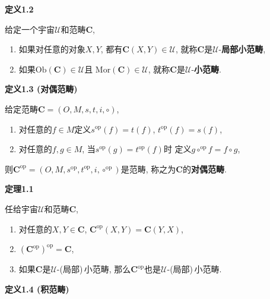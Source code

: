 \documentclass[UTF8]{ctexart}
\begin{document}
\hypertarget{sec:定义1.2}{}
\noindent\textbf{定义1.2}

给定一个宇宙$\mathcal{U}$和范畴$\mathbf{C}$,
\begin{enumerate}
    \item 如果对任意的对象$X,Y$, 都有$\mathbf{C}(X,Y)\in\mathcal{U}$,
    就称$\mathbf{C}$是$\mathcal{U}$-\textbf{局部小范畴},
    \item 如果$\mathrm{Ob}(\mathbf{C})\in\mathcal{U}$且
    $\mathrm{Mor}(\mathbf{C})\in\mathcal{U}$,
    就称$\mathbf{C}$是$\mathcal{U}$-\textbf{小范畴}.
\end{enumerate}

\vspace{10pt}

\hypertarget{sec:定义1.3}{}
\noindent\textbf{定义1.3 (对偶范畴)}

给定范畴$\mathbf{C}=(O,M,s,t,i,\circ)$,
\begin{enumerate}
    \item 对任意的$f\in M$定义$s^{\mathrm{op}}(f)=t(f)$, $t^{\mathrm{op}}(f)=s(f)$,
    \item 对任意的$f,g\in M$, 当$s^{\mathrm{op}}(g)=t^{\mathrm{op}}(f)$时
    定义$g\circ^{\mathrm{op}}f=f\circ g$,
\end{enumerate}
则$\mathbf{C}^{\mathrm{op}}=
(O,M,s^{\mathrm{op}},t^{\mathrm{op}},i,\circ^{\mathrm{op}})$是范畴,
称之为$\mathbf{C}$的\textbf{对偶范畴}.

\vspace{10pt}

\hypertarget{sec:定理1.1}{}
\noindent\textbf{定理1.1}

任给宇宙$\mathcal{U}$和范畴$\mathbf{C}$,
\begin{enumerate}
    \item 对任意的$X,Y\in\mathbf{C}$,
    $\mathbf{C}^{\mathrm{op}}(X,Y)=\mathbf{C}(Y,X)$,
    \item $(\mathbf{C}^{\mathrm{op}})^{\mathrm{op}}=\mathbf{C}$,
    \item 如果$\mathbf{C}$是$\mathcal{U}$-(局部)\,\!小范畴,
    那么$\mathbf{C}^{\mathrm{op}}$也是$\mathcal{U}$-(局部)\,\!小范畴.
\end{enumerate}





\newpage

\hypertarget{sec:定义1.4}{}
\noindent\textbf{定义1.4 (积范畴)}
\end{document}
